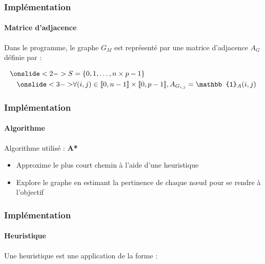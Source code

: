 
\begin{frame}
    \frametitle{Implémentation}
    \framesubtitle{Matrice d'adjacence}

    Dans le programme, le graphe $G_M$ est représenté par une matrice d'adjacence $A_G$ définie par :

    \begin{align*}
        \onslide<2-> S &= \{0, 1, \dots, n \times p - 1 \} \\
        \bigskip
        \onslide<3-> &\forall (i,j)\in \llbracket 0, n-1\rrbracket \times \llbracket 0, p-1\rrbracket,\space A_{G_{i,j}} = \mathbb{1}_{A} (i,j)
    \end{align*}
\end{frame}


\begin{frame}
\frametitle{Implémentation}
\framesubtitle{Algorithme}
Algorithme utilisé : \bigskip
    \textbf{A*}
    \begin{itemize}
        \item <2-> Approxime le plus court chemin à l'aide d'une heuristique
        \item <3-> Explore le graphe en estimant la pertinence de chaque nœud pour se rendre à l'objectif
    \end{itemize}


\end{frame}






\begin{frame}
    \frametitle{Implémentation}
    \framesubtitle{Heuristique}

    Une heuristique est une application de la forme :


\end{frame}




